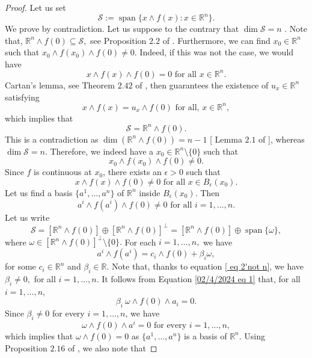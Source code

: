 \documentclass[11pt, a4paper, reqno]{amsart}
\numberwithin{equation}{section}
\newcommand{\spann}{\operatorname{span}}
\begin{document}
\begin{proof}
Let us set $$\mathcal S:=\spann \{x\wedge f(x):x\in \mathbb R^n\}.$$ We prove by contradiction. Let us suppose to the contrary that $\dim \mathcal S=n$ . Note that, $\mathbb R^n \wedge f(0)\subseteq \mathcal S,$ see Proposition $2.2$ of \cite{bandyopadhyay2015some}. Furthermore, 
 we can find $x_0\in \mathbb R^n$  such that $x_0\wedge f(x_0)\wedge f(0)\neq 0 .$ Indeed, if this was  not the case, we would have  $$x\wedge f(x)\wedge f(0)=0 \textrm{ for all } x\in \mathbb R^n.$$
 Cartan's lemma, see Theorem $2.42$ of \cite{csato2011pullback}, then guarantees the existence of  $u_x\in \mathbb R^n$ satisfying $$x\wedge f(x)=u_x\wedge f(0)\textrm{ for all, }x\in \mathbb R^n,$$
 which implies that $$\mathcal S=\mathbb R^n \wedge f(0).$$
 This is a contradiction as  $\dim (\mathbb R^n\wedge f(0))=n-1$ [ Lemma $2.1$ of \cite{bandyopadhyay2015some} ], whereas $\dim \mathcal S=n.$ Therefore, we indeed have a $x_0\in \mathbb R^n\setminus \{0\}$ such that $$x_0\wedge f(x_0)\wedge f(0)\neq 0.$$
 Since $f$ is continuous at $x_0$, there exists an $\epsilon >0$ such that $$x\wedge f(x)\wedge f(0)\neq 0\textrm{ for all  }x\in B_{\epsilon}(x_0).$$
Let us find a basis  $\{a^1,\ldots, a^n\}$ of $\mathbb R^n$ inside $B_{\epsilon}(x_0)$. Then 
\begin{equation} \label{ eq 2'not n}
a^i\wedge f(a^i)\wedge f(0)\neq 0 \textrm{ for all } i=1,\ldots, n.
\end{equation}
Let us write $$\mathcal S=\left[\mathbb R^n \wedge f(0)\right ]\oplus \left[\mathbb R^n \wedge f(0)\right ]^{\perp}=\left[\mathbb R^n \wedge f(0)\right]\oplus \spann \{\omega \},$$ where $\omega \in \left[\mathbb R^n \wedge f(0)\right]^{\perp}\setminus \{0\}.$ For each $i=1,\ldots,n,$ we have 
\begin{equation}\label{02/4/2024 eq 1}
a^i\wedge f(a^i)=c_i\wedge f(0)+\beta_i\omega,
\end{equation}
for some $c_i\in \mathbb R^n$ and $\beta_i\in \mathbb R.$ Note that, thanks to equation \ref{ eq 2'not n}, we have $\beta_i\neq 0,$ for all $i=1,\ldots,n$. It follows from Equation \ref{02/4/2024 eq 1} that, for all $i=1,\ldots,n$,   $$\beta_i \  \omega \wedge f(0)\wedge a_i=0.$$
Since $\beta_i\neq 0$ for every $i=1,\ldots,n$, we have $$\omega \wedge f(0)\wedge a^i=0 \textrm{ for every } i=1, \ldots, n,$$
which implies that $\omega \wedge f(0)=0$ as $\{a^1,\ldots, a^n\}$ is a basis of $\mathbb R^n$. Using Proposition $2.16$ of \cite{csato2011pullback}, we also note that 

\end{proof}
\end{document}
